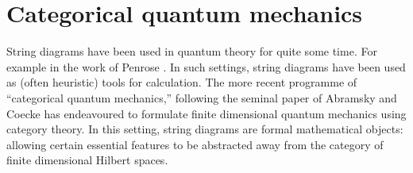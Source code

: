 


\section{Categorical quantum mechanics}
\label{sec:cqm}
%
%
%
%
%
%
%
%
%
%
%



String diagrams have been used in quantum theory for quite some time.  For example in the work of Penrose \cite{penrosei}.  In such settings, string diagrams have been used as (often heuristic) tools for calculation. The more recent programme of ``categorical quantum mechanics,'' following the seminal paper of Abramsky and Coecke \cite{abramsky} has endeavoured to formulate finite dimensional quantum mechanics using category theory.  In this setting,  string diagrams are formal mathematical objects: allowing certain essential features to be abstracted away from the category of finite dimensional Hilbert spaces.

